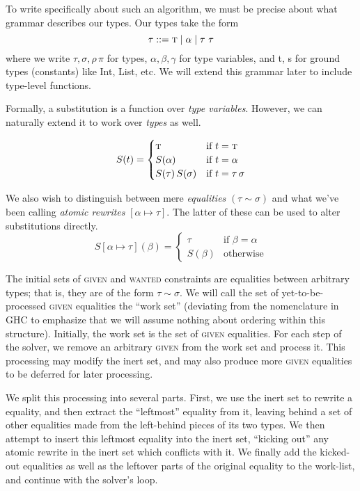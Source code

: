 \documentclass[10pt, letterpaper, oneside]{article}
\begin{document}
To write specifically about such an algorithm, we must be precise about what grammar describes our types. Our types take the form
\begin{equation*}
  \tau ::= \text{\sc t} \mid \alpha \mid \tau\ \tau
\end{equation*}
where we write \(\tau, \sigma, \rho\, \pi\) for types, \(\alpha, \beta, \gamma\) for type variables, and {\sc t}, {\sc s} for ground types (constants) like Int, List, etc. We will extend this grammar later to include type-level functions.

Formally, a substitution is a function over \emph{type variables}. However, we can naturally extend it to work over \emph{types} as well.

\begin{equation*}
  S(t) =
  \begin{cases}
    \text{\sc t} & \text{if } t = \text{\sc t}\\
    S(\alpha) & \text{if } t = \alpha\\
    S(\tau)\,S(\sigma) & \text{if } t = \tau\,\sigma
  \end{cases}
\end{equation*}

We also wish to distinguish between mere \emph{equalities} \((\tau \sim \sigma)\) and what we've been calling \emph{atomic rewrites} \([\alpha \mapsto \tau]\). The latter of these can be used to alter substitutions directly.
\begin{equation*}
  S[\alpha \mapsto \tau](\beta) =
  \begin{cases}
    \tau & \text{if } \beta = \alpha\\
    S(\beta) & \text{otherwise}
  \end{cases}
\end{equation*}

The initial sets of \textsc{given} and \textsc{wanted} constraints are equalities between arbitrary types; that is, they are of the form \(\tau \sim \sigma\). We will call the set of yet-to-be-processed \textsc{given} equalities the ``work set'' (deviating from the nomenclature in GHC to emphasize that we will assume nothing about ordering within this structure). Initially, the work set is the set of \textsc{given} equalities. For each step of the solver, we remove an arbitrary \textsc{given} from the work set and process it. This processing may modify the inert set, and may also produce more \textsc{given} equalities to be deferred for later processing.

We split this processing into several parts. First, we use the inert set to rewrite a  equality, and then extract the ``leftmost'' equality from it, leaving behind a set of other equalities made from the left-behind pieces of its two types. We then attempt to insert this leftmost equality into the inert set, ``kicking out'' any atomic rewrite in the inert set which conflicts with it. We finally add the kicked-out equalities as well as the leftover parts of the original  equality to the work-list, and continue with the solver's loop.
\end{document}
